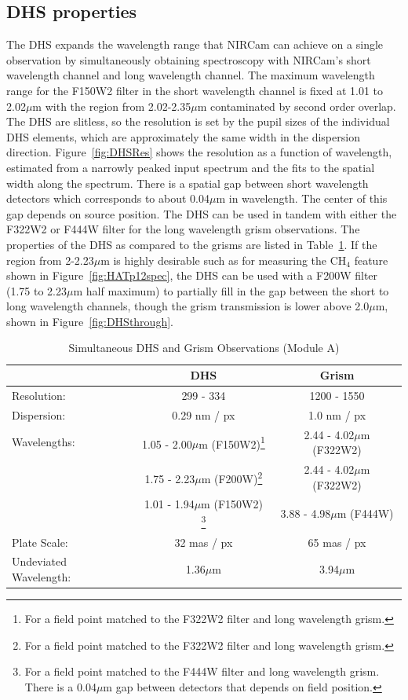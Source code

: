 \documentclass[iop]{emulateapj}
\newcommand{\DHSres}{299 - 334}
\newcommand{\DHSgap}{0.04}
\begin{document}
\subsection{DHS properties}
The DHS expands the wavelength range that NIRCam can achieve on a single observation by simultaneously obtaining spectroscopy with NIRCam's short wavelength channel and long wavelength channel.
The maximum wavelength range for the F150W2 filter in the short wavelength channel is fixed at 1.01 to 2.02$\mu$m with the region from 2.02-2.35$\mu$m contaminated by second order overlap.
The DHS are slitless, so the resolution is set by the pupil sizes of the individual DHS elements, which are approximately the same width in the dispersion direction.
Figure~\ref{fig:DHSRes} shows the resolution as a function of wavelength, estimated from a narrowly peaked input spectrum and the fits to the spatial width along the spectrum.
There is a spatial gap between short wavelength detectors which corresponds to about \DHSgap$\mu$m in wavelength.
The center of this gap depends on source position.
The DHS can be used in tandem with either the F322W2 or F444W filter for the long wavelength grism observations.
The properties of the DHS as compared to the grisms are listed in Table~\ref{tab:DHSgprop}.
If the region from 2-2.23$\mu$m is highly desirable such as for measuring the CH$_4$ feature shown in Figure~\ref{fig:HATp12spec}, the DHS can be used with a F200W filter (1.75 to 2.23$\mu$m half maximum) to partially fill in the gap between the short to long wavelength channels, though the grism transmission is lower above 2.0$\mu$m, shown in Figure~\ref{fig:DHSthrough}. 

\begin{table}[!t]
\centering
\caption{Simultaneous DHS and Grism Observations (Module A)}\label{tab:DHSgprop}
\begin{tabular}{lcc}
\hline \hline
 & DHS & Grism \\
\hline \hline		
Resolution: &  \DHSres & 1200 - 1550 \\
Dispersion: & 0.29 nm / px & 1.0 nm / px \\
Wavelengths: & 1.05 - 2.00$\mu$m (F150W2)\footnote{For a field point matched to the F322W2 filter and long wavelength grism.} & 2.44 - 4.02$\mu$m (F322W2)\\
			 & 1.75 - 2.23$\mu$m (F200W)\footnote{For a field point matched to the F322W2 filter and long wavelength grism.} & 2.44 - 4.02$\mu$m (F322W2)\\
			& 	1.01 - 1.94$\mu$m (F150W2) \footnote{For a field point matched to the F444W filter and long wavelength grism. There is a \DHSgap$\mu$m gap between detectors that depends on field position.}	& 3.88 - 4.98$\mu$m (F444W) \\
Plate Scale: & 32 mas / px  &  65 mas / px\\
Undeviated Wavelength: & 1.36$\mu$m & 3.94$\mu$m   \\
\hline
\end{tabular}
\end{table}
\end{document}
